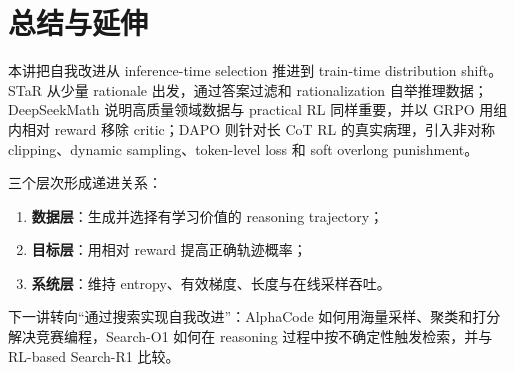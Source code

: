 \section{总结与延伸}

本讲把自我改进从 inference-time selection 推进到 train-time distribution shift。STaR 从少量 rationale 出发，通过答案过滤和 rationalization 自举推理数据；DeepSeekMath 说明高质量领域数据与 practical RL 同样重要，并以 GRPO 用组内相对 reward 移除 critic；DAPO 则针对长 CoT RL 的真实病理，引入非对称 clipping、dynamic sampling、token-level loss 和 soft overlong punishment。

三个层次形成递进关系：

\begin{enumerate}
    \item \textbf{数据层}：生成并选择有学习价值的 reasoning trajectory；
    \item \textbf{目标层}：用相对 reward 提高正确轨迹概率；
    \item \textbf{系统层}：维持 entropy、有效梯度、长度与在线采样吞吐。
\end{enumerate}

下一讲转向“通过搜索实现自我改进”：AlphaCode 如何用海量采样、聚类和打分解决竞赛编程，Search-O1 如何在 reasoning 过程中按不确定性触发检索，并与 RL-based Search-R1 比较。


